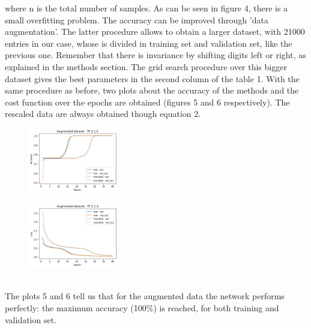 \documentclass[prl,twocolumn]{revtex4-1}
\begin{document}
where n is the total number of samples.
As can be seen in figure 4, there is a small overfitting problem. The accuracy can be improved through 'data augmentation'. The latter procedure allows to obtain a larger dataset, with 21000 entries in our case, whose is divided in training set and validation set, like the previous one. Remember that there is invariance by shifting digits left or right, as explained in the methods section. The grid search procedure over this bigger dataset gives the best parameters in the second column of the table 1. 
With the same procedure as before, two plots about the accuracy of the methods and the cost function over the epochs are obtained (figures 5 and 6 respectively). The rescaled data are always obtained though equation 2.
\begin{figure}[h]
	\includegraphics[width=0.35\textwidth]{aug_newTF.png}
	\caption{}
	\label{fig:y}
\end{figure}
\begin{figure}[h!!!]
	\includegraphics[width=0.35\textwidth]{aug_newTFloss.png}
	\caption{}
	\label{fig:y}
\end{figure}
\\
The plots 5 and 6 tell us that for the augmented data the network performs perfectly: the maximum accuracy (100\%) is reached, for both training and validation set.
\end{document}
